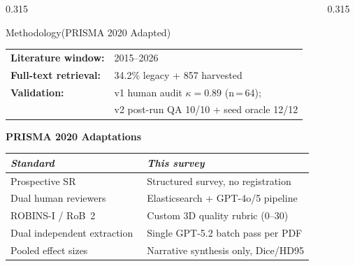 \documentclass[final,t]{beamer}
\begin{document}
\begin{frame}[t]
\begin{columns}[t,totalwidth=\textwidth]
\begin{column}{0.315\textwidth}
\begin{pblock}{Methodology\newline(PRISMA 2020 Adapted)}
\begin{center}
{%
}
\end{center}
\vspace{0.3em}
{\small\setlength{\tabcolsep}{4pt}
\begin{tabular}{@{}ll@{}}
  \textbf{Literature window:}    & 2015--2026 \\
  \textbf{Full-text retrieval:}  & 34.2\% legacy + 857 harvested \\
  \textbf{Validation:}           & v1 human audit $\kappa=0.89$ (n\,=\,64); \\
                                 & v2 post-run QA 10/10 + seed oracle 12/12 \\
\end{tabular}
}
\vspace{0.2em}
\begin{notebox}[utadred]
{\footnotesize
\textbf{PRISMA 2020 Adaptations}\\[3pt]
\setlength{\tabcolsep}{3pt}
\renewcommand{\arraystretch}{0.9}
\begin{tabular}{@{}p{0.45\linewidth}p{0.55\linewidth}@{}}
\textit{Standard} & \textit{This survey} \\
\midrule
Prospective SR & Structured survey, no registration \\
Dual human reviewers       & Elasticsearch + GPT-4o/5 pipeline \\
ROBINS-I / RoB~2           & Custom 3D quality rubric (0--30) \\
Dual independent extraction & Single GPT-5.2 batch pass per PDF \\
Pooled effect sizes         & Narrative synthesis only, Dice/HD95 \\
\end{tabular}
}
\end{notebox}
\end{pblock}

\end{column}
\hfill

\begin{column}{0.315\textwidth}


\end{column}
\end{columns}
\end{frame}
\end{document}
